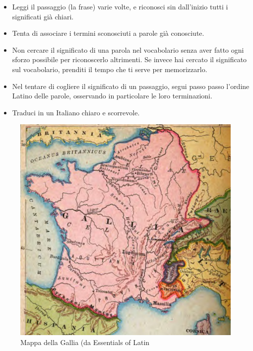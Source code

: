 \documentclass[nols]{tufte-handout}
\newcommand{\textls}[2][5]{%
    \begingroup\addfontfeatures{LetterSpace=#1}#2\endgroup
  }
\renewcommand{\smallcapsspacing}[1]{\textls[10]{#1}}
\renewcommand{\textsc}[1]{\smallcapsspacing{\textsmallcaps{#1}}}
\begin{document}
\begin{itemize}
\item[\textsc{1.}] Leggi il passaggio (la frase) varie volte, e riconosci sin dall'inizio tutti i significati già chiari.
\item[\textsc{2.}] Tenta di associare i termini sconosciuti a parole già conosciute.
\item[\textsc{3.}] Non cercare il significato di una parola nel vocabolario senza aver fatto ogni sforzo possibile per riconoscerlo altrimenti. Se invece hai cercato il significato sul vocabolario, prenditi il tempo che ti serve per memorizzarlo.
\item[\textsc{4.}] Nel tentare di cogliere il significato di un passaggio, segui passo passo l'ordine Latino delle parole, osservando in particolare le loro terminazioni.
\item[\textsc{5.}] Traduci in un Italiano chiaro e scorrevole.
\end{itemize}

\newpage

\begin{figure}[!h]
  \includegraphics{mappaGalliaExEssentialsOfLatinDetail.jpeg}
  \caption{Mappa della Gallia (da Essentials of Latin}
  \label{fig:textfig}
\end{figure}
\end{document}
